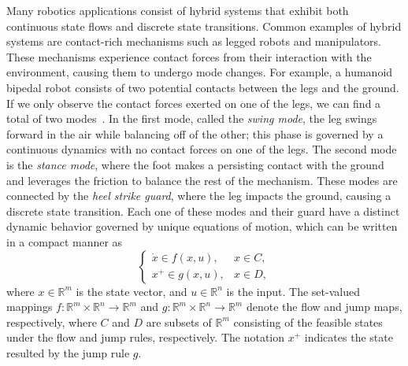 

Many robotics applications consist of hybrid systems that exhibit both
continuous state flows and discrete state transitions. Common examples of hybrid
systems are contact-rich mechanisms such as legged robots and manipulators.
These mechanisms experience contact forces from their interaction with the
environment, causing them to undergo mode changes. 
%
For example, a humanoid bipedal robot consists of two potential contacts between
the legs and the ground.
%
If we only observe the contact forces exerted on one of the legs, we can find a
total of two modes~\cite{underactuated}.
%
In the first mode, called the \textit{swing mode}, the leg swings forward in the
air while balancing off of the other; this phase is governed by a continuous
dynamics with no contact forces on one of the legs. 
%
The second mode is the \textit{stance mode}, where the foot makes a persisting
contact with the ground and leverages the friction to balance the rest of the
mechanism.
%
These modes are connected by the \textit{heel strike guard}, where the leg
impacts the ground, causing a discrete state transition. 
%
Each one of these modes and their guard have a distinct dynamic behavior
governed by unique equations of motion, which can be written in a compact manner
as\cite{goebel2009hybrid}
\begin{equation}
    \begin{cases}
        \dot{x} \in f(x, u), & x \in C,\\
        x^+ \in g(x, u), & x \in D,
    \end{cases}
    \label{eq:cont_and_guards}
\end{equation}
\noindent where $x \in \mathbb{R}^m$ is the state vector, and $u \in
\mathbb{R}^n$ is the input.
%
The set-valued mappings $f: \mathbb{R}^m \times \mathbb{R}^n \rightarrow
\mathbb{R}^m$ and $g: \mathbb{R}^m \times \mathbb{R}^n \rightarrow \mathbb{R}^m$
denote the flow and jump maps, respectively, where $C$ and $D$ are subsets of
$\mathbb{R}^m$ consisting of the feasible states under the flow and jump
rules, respectively. 
%
The notation $x^+$ indicates the state resulted by the jump rule $g$.

